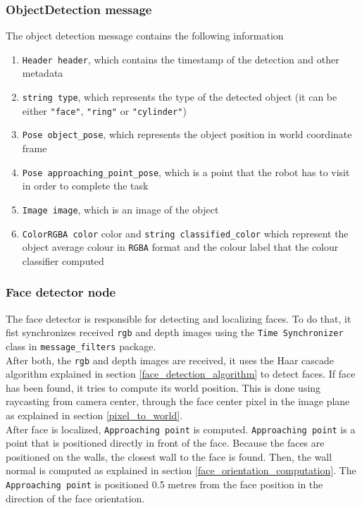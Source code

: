 \documentclass[12pt,a4paper]{article}
\begin{document}
	\subsubsection{ObjectDetection message}
	The object detection message contains the following information
	\begin{enumerate}
		\item \texttt{Header header}, which contains the timestamp of the detection and other metadata
		\item \texttt{string type}, which represents the type of the detected object (it can be either \texttt{"face"}, \texttt{"ring"} or \texttt{"cylinder"})
		\item \texttt{Pose object\_pose}, which represents the object position in world coordinate frame
		\item \texttt{Pose approaching\_point\_pose}, which is a point that the robot has to visit in order to complete the task
		\item \texttt{Image image}, which is an image of the object
		\item \texttt{ColorRGBA color} color and \texttt{string classified\_color} which represent the object average colour in \texttt{RGBA} format and the colour label that the colour classifier computed
	\end{enumerate}

	
	\subsubsection{Face detector node}
	The face detector is responsible for detecting and localizing faces. To do that, it fist synchronizes received \texttt{rgb} and depth images using the \texttt{Time Synchronizer} class in \texttt{message\_filters} package. \\

	After both, the \texttt{rgb} and depth images are received, it uses the Haar cascade algorithm explained in section \ref{face_detection_algorithm} to detect faces. If face has been found, it tries to compute its world position. This is done using raycasting from camera center, through the face center pixel in the image plane as explained in section \ref{pixel_to_world}. \\

	After face is localized, \texttt{Approaching point} is computed. \texttt{Approaching point} is a point that is positioned directly in front of the face. Because the faces are positioned on the walls, the closest wall to the face is found. Then, the wall normal is computed as explained in section \ref{face_orientation_computation}. The \texttt{Approaching point} is positioned 0.5 metres from the face position in the direction of the face orientation. \\
\end{document}
